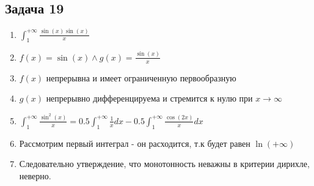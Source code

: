 \documentclass[a4paper,12pt]{article}
\begin{document}
\subsection{Задача 19}
\begin{enumerate}
    \item $\int_{1}^{+\infty}\frac{\sin(x)\sin(x)}{x}$
    \item $f(x)=\sin(x)\land g(x) = \frac{\sin(x)}{x}$
    \item $f(x)$ непрерывна и имеет ограниченную первообразную
    \item $g(x)$ непрерывно дифференцируема и стремится к нулю при $x \to \infty$
    \item $\int_{1}^{+\infty} \frac{\sin^2(x)}{x} = 0.5 \int_{1}^{+\infty} \frac{1}{x}dx-0.5\int_{1}^{+\infty} \frac{\cos(2x)}{x}dx$
    \item Рассмотрим первый интеграл - он расходится, т.к будет равен $\ln(+\infty)$
    \item Следовательно утверждение, что монотонность неважны в критерии дирихле, неверно.
\end{enumerate}
\end{document}
